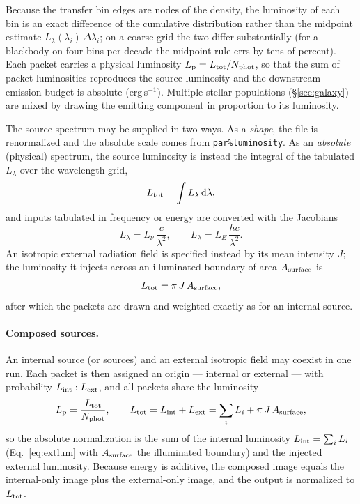 \documentclass[english,a4paper]{kiseon_memo}
\newcommand{\dd}{\mathrm{d}}
\newcommand{\pp}[1]{\texttt{par\%#1}}
\begin{document}
Because the transfer bin edges are nodes of the density, the luminosity of each
bin is an exact difference of the cumulative distribution rather than the
midpoint estimate $L_\lambda(\lambda_i)\,\Delta\lambda_i$; on a coarse grid the
two differ substantially (for a blackbody on four bins per decade the midpoint
rule errs by tens of percent).  Each packet carries a physical luminosity
$L_{\rm p}=L_{\rm tot}/N_{\rm phot}$, so that the sum of packet luminosities
reproduces the source luminosity and the downstream emission budget is absolute
(erg\,s$^{-1}$).  Multiple stellar populations (\S\ref{sec:galaxy}) are mixed by
drawing the emitting component in proportion to its luminosity.

The source spectrum may be supplied in two ways.  As a \emph{shape}, the file is
renormalized and the absolute scale comes from \pp{luminosity}.  As an
\emph{absolute} (physical) spectrum, the source luminosity is instead the integral
of the tabulated $L_\lambda$ over the wavelength grid,
\begin{equation}
  L_{\rm tot}=\int L_\lambda\,\dd\lambda ,
\end{equation}
and inputs tabulated in frequency or energy are converted with the Jacobians
\begin{equation}
  L_\lambda = L_\nu\,\frac{c}{\lambda^2},
  \qquad
  L_\lambda = L_E\,\frac{hc}{\lambda^2}.
\end{equation}
An isotropic external radiation field is specified instead by its mean intensity
$J$; the luminosity it injects across an illuminated boundary of area
$A_{\rm surface}$ is
\begin{equation}
  L_{\rm tot}=\pi\,J\,A_{\rm surface},
  \label{eq:extlum}
\end{equation}
after which the packets are drawn and weighted exactly as for an internal source.

\paragraph{Composed sources.}  An internal source (or sources) and an external
isotropic field may coexist in one run.  Each packet is then assigned an origin
--- internal or external --- with probability $L_{\rm int}:L_{\rm ext}$, and all
packets share the luminosity
\begin{equation}
  L_{\rm p}=\frac{L_{\rm tot}}{N_{\rm phot}},\qquad
  L_{\rm tot}=L_{\rm int}+L_{\rm ext}
            =\sum_i L_i + \pi\,J\,A_{\rm surface},
  \label{eq:composelum}
\end{equation}
so the absolute normalization is the sum of the internal luminosity
$L_{\rm int}=\sum_i L_i$ (Eq.~\ref{eq:extlum} with $A_{\rm surface}$ the
illuminated boundary) and the injected external luminosity.  Because energy is
additive, the composed image equals the internal-only image plus the
external-only image, and the output is normalized to $L_{\rm tot}$.
\end{document}
